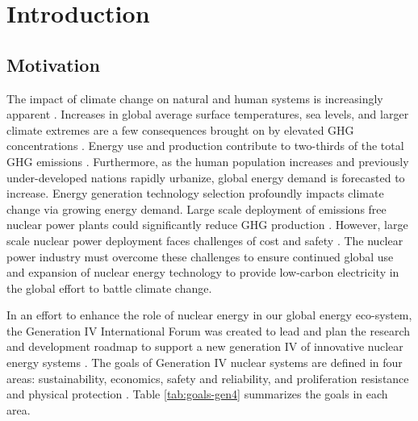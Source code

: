 \chapter{Introduction}


\section{Motivation}
The impact of climate change on natural and human systems is increasingly 
apparent \cite{noauthor_climate_2018}.
Increases in global average surface temperatures, sea levels, and larger climate 
extremes are a few consequences brought on by elevated \gls{GHG} concentrations 
\cite{noauthor_climate_2018}.
Energy use and production contribute to two-thirds of the total \gls{GHG}
emissions \cite{noauthor_climate_2018}.
Furthermore, as the human population increases and previously under-developed 
nations rapidly urbanize, global energy demand is forecasted to increase.  
Energy generation technology selection profoundly impacts climate change via 
growing energy demand. 
Large scale deployment of emissions free nuclear power plants could 
significantly reduce GHG production \cite{noauthor_climate_2018}.  
However, large scale nuclear power deployment faces challenges of cost and 
safety \cite{petti_future_2018}. 
The nuclear power industry must overcome these challenges to ensure continued 
global use and expansion of nuclear energy technology to provide low-carbon 
electricity in the global effort to battle climate change. 

In an effort to enhance the role of nuclear energy in our global energy 
eco-system, the Generation IV International Forum was created to lead and plan 
the research and development roadmap to support a new generation IV of innovative 
nuclear energy systems \cite{gif_technology_2002}.
The goals of Generation IV nuclear systems are defined in four areas: 
sustainability, economics, safety and reliability, and proliferation resistance 
and physical protection \cite{gif_technology_2002}. 
Table \ref{tab:goals-gen4} summarizes the goals in each area. 

